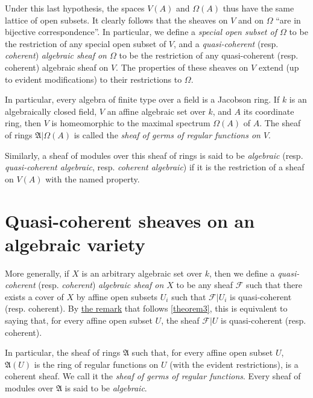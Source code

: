 \documentclass{article}
\theoremstyle{plain}
\theoremstyle{definition}
\newcommand{\sh}{\mathscr}
\newcommand{\oldpage}[1]{\marginpar{\footnotesize$\Big\vert$ \textit{p.~#1}}}
\begin{document}
Under this last hypothesis, the spaces $V(A)$ and $\Omega(A)$ thus have the same lattice of open subsets.
It clearly follows that the sheaves on $V$ and on $\Omega$ ``are in bijective correspondence''.
In particular, we define a \emph{special open subset of $\Omega$} to be the restriction of any special open subset of $V$, and a \emph{quasi-coherent} (resp. \emph{coherent}) \emph{algebraic sheaf on $\Omega$} to be the restriction of any quasi-coherent (resp. coherent) algebraic sheaf on $V$.
The properties of these sheaves on $V$ extend (up to evident modifications) to their restrictions to $\Omega$.

In particular, every algebra of finite type over a field is a Jacobson ring.
If $k$ is an algebraically closed field, $V$ an affine algebraic set over $k$, and $A$ its coordinate ring, then $V$ is homeomorphic to the maximal spectrum
\oldpage{1-12}
$\Omega(A)$ of $A$.
The sheaf of rings $\mathfrak{A}|\Omega(A)$ is called the \emph{sheaf of germs of regular functions on $V$}.

Similarly, a sheaf of modules over this sheaf of rings is said to be \emph{algebraic} (resp. \emph{quasi-coherent algebraic}, resp. \emph{coherent algebraic}) if it is the restriction of a sheaf on $V(A)$ with the named property.


\section{Quasi-coherent sheaves on an algebraic variety}
\label{section6}

More generally, if $X$ is an arbitrary algebraic set over $k$, then we define a \emph{quasi-coherent} (resp. \emph{coherent}) \emph{algebraic sheaf on $X$} to be any sheaf $\sh{F}$ such that there exists a cover of $X$ by affine open subsets $U_i$ such that $\sh{F}|U_i$ is quasi-coherent (resp. coherent).
By \hyperref[remark-theorem3]{the remark} that follows \cref{theorem3}, this is equivalent to saying that, for every affine open subset $U$, the sheaf $\sh{F}|U$ is quasi-coherent (resp. coherent).

In particular, the sheaf of rings $\mathfrak{A}$ such that, for every affine open subset $U$, $\mathfrak{A}(U)$ is the ring of regular functions on $U$ (with the evident restrictions), is a coherent sheaf.
We call it the \emph{sheaf of germs of regular functions}.
Every sheaf of modules over $\mathfrak{A}$ is said to be \emph{algebraic}.


\end{document}
